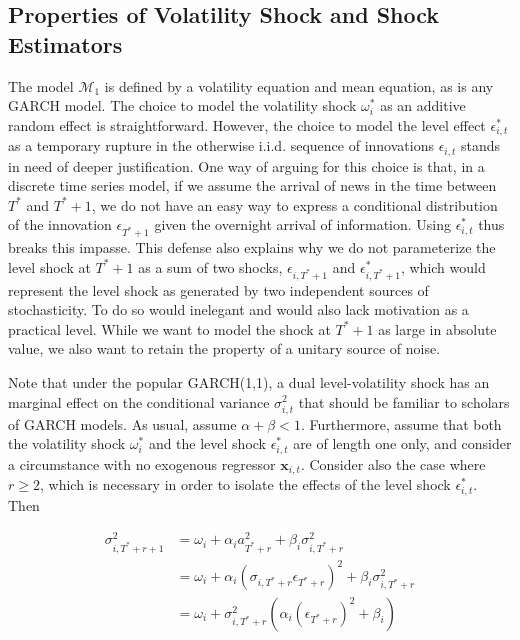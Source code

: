\documentclass[11pt]{article}
\newcommand{\x}{\textbf{x}}
\def\mc#1{\mathcal{#1}} %
\def\mc#1{\mathcal{#1}}
\theoremstyle{definition}
\begin{document}

\subsection{Properties of Volatility Shock and Shock Estimators}

The model $\mc{M}_1$ is defined by a volatility equation and mean equation, as is any GARCH model.  The choice to model the volatility shock $\omega^{*}_{i}$ as an additive random effect is straightforward.  However, the choice to model the level effect $\epsilon^{*}_{i,t}$ as a temporary rupture in the otherwise i.i.d. sequence of innovations $\epsilon_{i,t}$ stands in need of deeper justification.  One way of arguing for this choice is that, in a discrete time series model, if we assume the arrival of news in the time between $T^{*}$ and $T^{*}+1$, we do not have an easy way to express a conditional distribution of the innovation $\epsilon_{T^{*}+1}$ given the overnight arrival of information.  Using $\epsilon^{*}_{i,t}$ thus breaks this impasse.  This defense also explains why we do not parameterize the level shock at $T^{*}+1$ as a sum of two shocks, $\epsilon_{i,T^{*}+1}$ and $\epsilon^{*}_{i,T^{*}+1}$, which would represent the level shock as generated by two independent sources of stochasticity.  To do so would inelegant and would also lack motivation as a practical level.  While we want to model the shock at $T^{*}+1$ as large in absolute value, we also want to retain the property of a unitary source of noise.

Note that under the popular GARCH(1,1), a dual level-volatility shock has an marginal effect on the conditional variance $\sigma^{2}_{i,t}$ that should be familiar to scholars of GARCH models.  As usual, assume $\alpha+\beta < 1$.  Furthermore, assume that both the volatility shock $\omega^{*}_{i}$ and the level shock $\epsilon^{*}_{i,t}$ are of length one only, and consider a circumstance with no exogenous regressor $\x_{i,t}$. Consider also the case where $r\geq 2$, which is necessary in order to isolate the effects of the level shock $\epsilon^{*}_{i,t}$.  Then

\begin{align}
\sigma^{2}_{i,T^{*}+r+1} & = \omega_{i} + \alpha_{i} a_{T^{*}+r}^{2} + \beta_{i}\sigma^{2}_{i,T^{*}+r} \label{eq0}\\
& = \omega_{i} + \alpha_{i}(\sigma_{i,T^{*}+r}\epsilon_{T^{*}+r})^{2} + \beta_{i}\sigma^{2}_{i,T^{*}+r} \\
& = \omega_{i} + \sigma^{2}_{i,T^{*}+r}(\alpha_{i} (\epsilon_{T^{*}+r})^{2} + \beta_{i})
\end{align}
\end{document}
